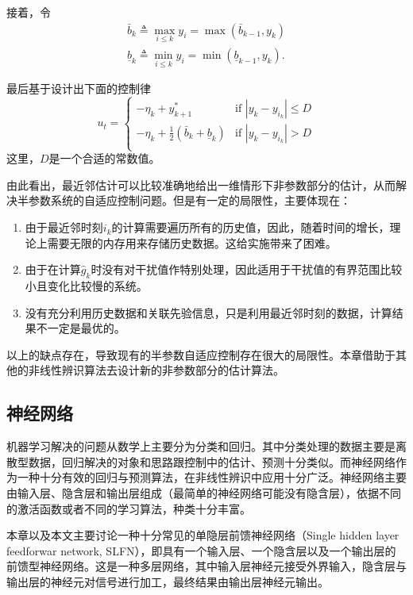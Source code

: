 接着，令
\begin{equation}\label{eq.4:bk}
\begin{array}{lll}
\bar{b}_k\triangleq \max\limits_{i\leq k}y_i
         =\max(\bar{b}_{k-1}, y_k)\\
\underline{b}_k\triangleq \min\limits_{i\leq k}{y_i}
                =\min(\underline{b}_{k-1}, y_k).
\end{array} 
\end{equation}

最后基于设计出下面的控制律
\begin{equation}\label{eq:4.uk}
u_{t}=\left\{
\begin{array}{cc}
  -\hat \eta_k+y_{k+1}^* & \text{if } |y_k-y_{i_k}|\le D \\
  -\hat \eta_k+\frac12(\bar b_k+\underline b_k) & \text{if } |y_k-y_{i_k}|> D \\
\end{array}
\right.
\end{equation}
这里，$D$是一个合适的常数值。

由此看出，最近邻估计可以比较准确地给出一维情形下非参数部分的估计，从而解决半参数系统的自适应控制问题。但是有一定的局限性，主要体现在：
\begin{enumerate}
\item 由于最近邻时刻$i_k$的计算需要遍历所有的历史值，因此，随着时间的增长，理论上需要无限的内存用来存储历史数据。这给实施带来了困难。
\item 由于在计算$\hat{g}_k$时没有对干扰值作特别处理，因此适用于干扰值的有界范围比较小且变化比较慢的系统。
\item 没有充分利用历史数据和关联先验信息，只是利用最近邻时刻的数据，计算结果不一定是最优的。
\end{enumerate}

以上的缺点存在，导致现有的半参数自适应控制存在很大的局限性。本章借助于其他的非线性辨识算法去设计新的非参数部分的估计算法。

\subsection{神经网络}
机器学习解决的问题从数学上主要分为分类和回归。其中分类处理的数据主要是离散型数据，回归解决的对象和思路跟控制中的估计、预测十分类似。而神经网络作为一种十分有效的回归与预测算法，在非线性辨识中应用十分广泛。神经网络主要由输入层、隐含层和输出层组成（最简单的神经网络可能没有隐含层），依据不同的激活函数或者不同的学习算法，种类十分丰富。

本章以及本文主要讨论一种十分常见的单隐层前馈神经网络（Single hidden layer feedforwar network, SLFN），即具有一个输入层、一个隐含层以及一个输出层的前馈型神经网络。这是一种多层网络，其中输入层神经元接受外界输入，隐含层与输出层的神经元对信号进行加工，最终结果由输出层神经元输出。

